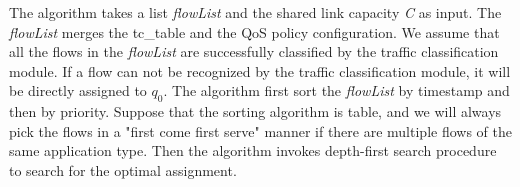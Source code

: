 The algorithm takes a list \emph{flowList} and the shared link capacity \emph{C} as input. The \emph{flowList} merges the tc\_table and the
QoS policy configuration. We assume that all the flows in the \emph{flowList} are successfully classified by the traffic classification module.
If a flow can not be recognized by the traffic classification module, it will be directly assigned to $q_0$. The algorithm first sort the
\emph{flowList} by timestamp and then by priority. Suppose that the sorting algorithm is table, and we will always pick the flows in a
"first come first serve" manner if there are multiple flows of the same application type. Then the algorithm invokes depth-first search procedure
to search for the optimal assignment.
